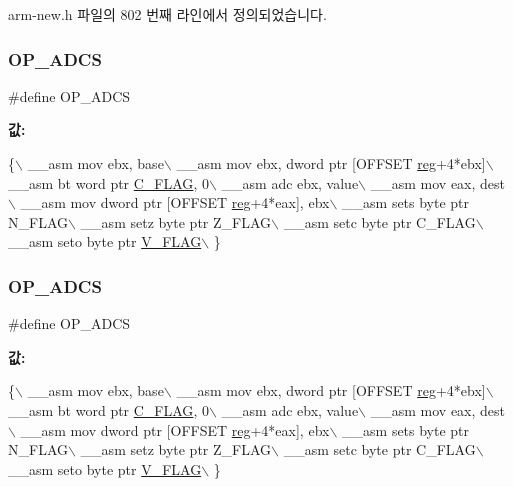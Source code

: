 arm-\/new.\+h 파일의 802 번째 라인에서 정의되었습니다.

\mbox{\label{_g_b_a_8cpp_ab1994f2856458d70ba65c58f1f651cf7}} 
\subsubsection{\texorpdfstring{O\+P\+\_\+\+A\+D\+CS}{OP\_ADCS}\hspace{0.1cm}{\footnotesize\ttfamily [1/2]}}
{\footnotesize\ttfamily \#define O\+P\+\_\+\+A\+D\+CS}

{\bfseries 값\+:}
\begin{DoxyCode}
\{\(\backslash\)
        \_\_asm mov ebx, base\(\backslash\)
        \_\_asm mov ebx, dword ptr [OFFSET \mbox{\hyperlink{_g_b_a_8h_ae29faba89509024ffd1a292badcedf2d}{reg}}+4*ebx]\(\backslash\)
        \_\_asm bt word ptr \mbox{\hyperlink{_g_b_8h_aa29c80f7f7f901ec7a2c57887f56585d}{C\_FLAG}}, 0\(\backslash\)
        \_\_asm adc ebx, value\(\backslash\)
        \_\_asm mov eax, dest\(\backslash\)
        \_\_asm mov dword ptr [OFFSET \mbox{\hyperlink{_g_b_a_8h_ae29faba89509024ffd1a292badcedf2d}{reg}}+4*eax], ebx\(\backslash\)
        \_\_asm sets byte ptr N\_FLAG\(\backslash\)
        \_\_asm setz byte ptr Z\_FLAG\(\backslash\)
        \_\_asm setc byte ptr C\_FLAG\(\backslash\)
        \_\_asm seto byte ptr \mbox{\hyperlink{_g_b_a_8h_a11a0e7b14a93be5eb2720b0151900919}{V\_FLAG}}\(\backslash\)
      \}
\end{DoxyCode}
\mbox{\label{arm-new_8h_ab1994f2856458d70ba65c58f1f651cf7}} 
\subsubsection{\texorpdfstring{O\+P\+\_\+\+A\+D\+CS}{OP\_ADCS}\hspace{0.1cm}{\footnotesize\ttfamily [2/2]}}
{\footnotesize\ttfamily \#define O\+P\+\_\+\+A\+D\+CS}

{\bfseries 값\+:}
\begin{DoxyCode}
\{\(\backslash\)
        \_\_asm mov ebx, base\(\backslash\)
        \_\_asm mov ebx, dword ptr [OFFSET \mbox{\hyperlink{_g_b_a_8h_ae29faba89509024ffd1a292badcedf2d}{reg}}+4*ebx]\(\backslash\)
        \_\_asm bt word ptr \mbox{\hyperlink{_g_b_8h_aa29c80f7f7f901ec7a2c57887f56585d}{C\_FLAG}}, 0\(\backslash\)
        \_\_asm adc ebx, value\(\backslash\)
        \_\_asm mov eax, dest\(\backslash\)
        \_\_asm mov dword ptr [OFFSET \mbox{\hyperlink{_g_b_a_8h_ae29faba89509024ffd1a292badcedf2d}{reg}}+4*eax], ebx\(\backslash\)
        \_\_asm sets byte ptr N\_FLAG\(\backslash\)
        \_\_asm setz byte ptr Z\_FLAG\(\backslash\)
        \_\_asm setc byte ptr C\_FLAG\(\backslash\)
        \_\_asm seto byte ptr \mbox{\hyperlink{_g_b_a_8h_a11a0e7b14a93be5eb2720b0151900919}{V\_FLAG}}\(\backslash\)
      \}
\end{DoxyCode}


